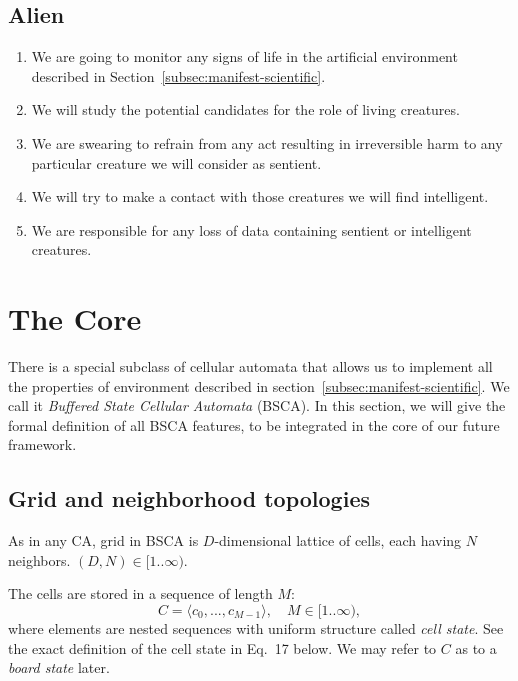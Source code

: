 \documentclass[a4paper,12pt,tikz,UTF8]{article}
\begin{document}
  \subsection{Alien}

  \begin{enumerate}
    \item We are going to monitor any signs of life in the artificial environment described in Section~\ref{subsec:manifest-scientific}.
    \item We will study the potential candidates for the role of living creatures.
    \item We are swearing to refrain from any act resulting in irreversible harm to any particular creature we will consider as sentient.
    \item We will try to make a contact with those creatures we will find intelligent.
    \item We are responsible for any loss of data containing sentient or intelligent creatures.
  \end{enumerate}

  \newpage

  \section{The Core}
  \label{sec:the-core}

  There is a special subclass of cellular automata that allows us to implement all the properties of environment described in section~\ref{subsec:manifest-scientific}. We call it \textit{Buffered State Cellular Automata} (BSCA). In this section, we will give the formal definition of all BSCA features, to be integrated in the core of our future framework.

  \subsection{Grid and neighborhood topologies}

    As in any CA, grid in BSCA is $D$-dimensional lattice of cells, each having $N$ neighbors. $(D, N) \in [1 .. \infty)$.

    The cells are stored in a sequence of length $M$:
    \begin{equation}
      \label{eq:cells}
      C = \langle c_0, ..., c_{M - 1} \rangle, \quad M \in {[1 .. \infty)},
    \end{equation}
    where elements are nested sequences with uniform structure called \textit{cell state}. See the exact definition of the cell state in Eq.~17 below. We may refer to $C$ as to a \textit{board state} later.
\end{document}
